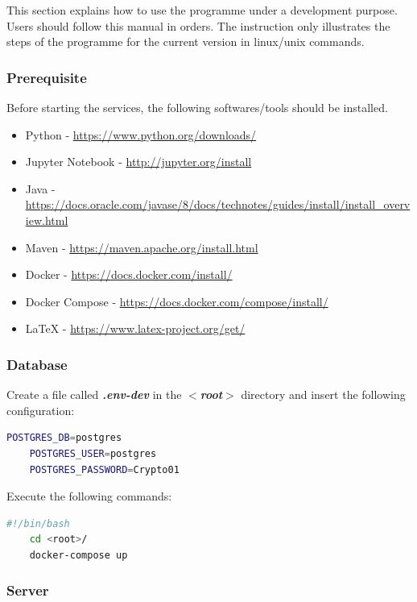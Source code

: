 \documentclass[11pt]{article} %
\theoremstyle{plain}
\theoremstyle{definition}
\begin{document}
This section explains how to use the programme under a development purpose. Users should follow this manual in orders. The instruction only illustrates the steps of the programme for the current version in linux/unix commands.

\subsubsection{Prerequisite}

Before starting the services, the following softwares/tools should be installed.

\begin{itemize}
    \item Python - \url{https://www.python.org/downloads/}
    \item Jupyter Notebook - \url{http://jupyter.org/install}
    \item Java - \url{https://docs.oracle.com/javase/8/docs/technotes/guides/install/install_overview.html}
    \item Maven - \url{https://maven.apache.org/install.html}
    \item Docker - \url{https://docs.docker.com/install/}
    \item Docker Compose - \url{https://docs.docker.com/compose/install/}
    \item LaTeX - \url{https://www.latex-project.org/get/}
\end{itemize}

\subsubsection{Database}

Create a file called \textsl{\textbf{.env-dev}} in the \textsl{\textbf{$<$root$>$}} directory and insert the following configuration:

\begin{lstlisting}[language=bash]
    POSTGRES_DB=postgres
    POSTGRES_USER=postgres
    POSTGRES_PASSWORD=Crypto01
\end{lstlisting}

\noindent
Execute the following commands:

\begin{lstlisting}[language=bash]
    #!/bin/bash
    cd <root>/
    docker-compose up
\end{lstlisting}

\subsubsection{Server}
\end{document}
